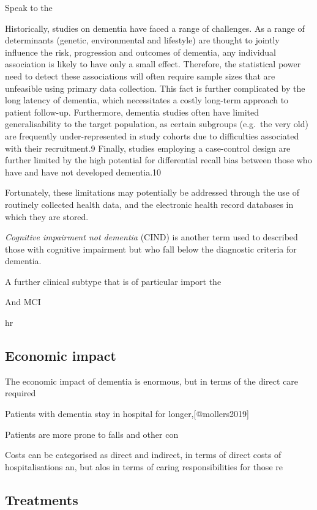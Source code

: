 \documentclass[a4paper,nobind]{templates/ociamthesis}
\begin{document}
Speak to the

Historically, studies on dementia have faced a range of challenges. As a range of determinants (genetic, environmental and lifestyle) are thought to jointly influence the risk, progression and outcomes of dementia, any individual association is likely to have only a small effect. Therefore, the statistical power need to detect these associations will often require sample sizes that are unfeasible using primary data collection. This fact is further complicated by the long latency of dementia, which necessitates a costly long-term approach to patient follow-up. Furthermore, dementia studies often have limited generalisability to the target population, as certain subgroups (e.g.~the very old) are frequently under-represented in study cohorts due to difficulties associated with their recruitment.9 Finally, studies employing a case-control design are further limited by the high potential for differential recall bias between those who have and have not developed dementia.10

Fortunately, these limitations may potentially be addressed through the use of routinely collected health data, and the electronic health record databases in which they are stored.

\emph{Cognitive impairment not dementia} (CIND) is another term used to described those with cognitive impairment but who fall below the diagnostic criteria for dementia.

A further clinical subtype that is of particular import the

And MCI

hr

\hypertarget{economic-impact}{%
\subsection{Economic impact}\label{economic-impact}}

The economic impact of dementia is enormous, but in terms of the direct care required

Patients with dementia stay in hospital for longer,{[}@mollers2019{]}

Patients are more prone to falls and other con

Costs can be categorised as direct and indirect, in terms of direct costs of hospitalisations an, but alos in terms of caring responsibilities for those re

\hypertarget{treatments}{%
\subsection{Treatments}\label{treatments}}
\end{document}
